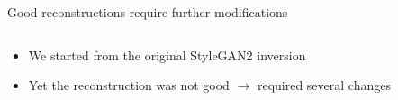 \documentclass[8pt,xcolor=table,aspectratio=169]{beamer}
\DeclareMathOperator*{\argmin}{arg\,min}
\begin{document}
\newcommand{\txc}[1]{\mathbin{\textcolor{red}{#1}}}
\newcommand{\szb}{0.8}
\begin{frame}{Good reconstructions require further modifications}

\begin{columns}

\begin{column}{0.5\textwidth}
\begin{itemize}
  \item We started from the original StyleGAN2 inversion
 
 \vo
 
  \item Yet the reconstruction was not good $\to$ required several changes
\begin{overprint}
 
 
 
 
 
 
\end{overprint}


%  
 
 
\end{itemize}
\end{column}
\begin{column}{0.5\textwidth}



\end{column}
\end{columns}
\end{frame}
\end{document}
